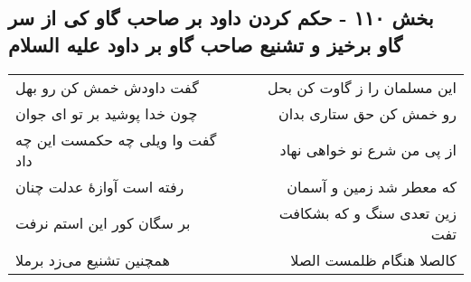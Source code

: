 \begin{center}
\section*{بخش ۱۱۰ - حکم کردن داود بر صاحب گاو کی از سر گاو برخیز و تشنیع صاحب گاو بر داود علیه السلام}
\label{sec:sh110}
\begin{longtable}{l p{0.5cm} r}
گفت داودش خمش کن رو بهل
&&
این مسلمان را ز گاوت کن بحل
\\
چون خدا پوشید بر تو ای جوان
&&
رو خمش کن حق ستاری بدان
\\
گفت وا ویلی چه حکمست این چه داد
&&
از پی من شرع نو خواهی نهاد
\\
رفته است آوازهٔ عدلت چنان
&&
که معطر شد زمین و آسمان
\\
بر سگان کور این استم نرفت
&&
زین تعدی سنگ و که بشکافت تفت
\\
همچنین تشنیع می‌زد برملا
&&
کالصلا هنگام ظلمست الصلا
\\
\end{longtable}
\end{center}
